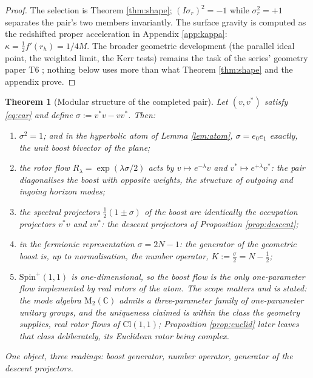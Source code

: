 \documentclass[11pt]{article}
\newtheorem{theorem}{Theorem}[section]
\theoremstyle{definition}
\newcommand{\Cl}{\mathrm{Cl}}
\newcommand{\C}{\mathbb{C}}
\newcommand{\Mat}{\mathrm{M}}
\begin{document}
\begin{proof}
The selection is Theorem \ref{thm:shape}; $(I\sigma_r)^2 = -1$ while $\sigma_r^2 = +1$ separates the pair's two members invariantly. The surface gravity is computed as the redshifted proper acceleration in Appendix \ref{app:kappa}: $\kappa = \tfrac12 f'(r_h) = 1/4M$. The broader geometric development (the parallel ideal point, the weighted limit, the Kerr tests) remains the task of the series' geometry paper T6 \cite{ButlerT6}; nothing below uses more than what Theorem \ref{thm:shape} and the appendix prove.
\end{proof}

\begin{theorem}[Modular structure of the completed pair]\label{thm:modular}
Let $(v, v^*)$ satisfy \eqref{eq:car} and define $\sigma := v^* v - v v^*$. Then:
\begin{enumerate}
\item $\sigma^2 = 1$; and in the hyperbolic atom of Lemma \ref{lem:atom}, $\sigma = e_0 e_1$ exactly, the unit boost bivector of the plane;
\item the rotor flow $R_\lambda = \exp(\lambda\sigma/2)$ acts by $v \mapsto e^{-\lambda} v$ and $v^* \mapsto e^{+\lambda} v^*$: the pair diagonalises the boost with opposite weights, the structure of outgoing and ingoing horizon modes;
\item the spectral projectors $\tfrac12(1 \pm \sigma)$ of the boost are identically the occupation projectors $v^* v$ and $v v^*$: the descent projectors of Proposition \ref{prop:descent};
\item in the fermionic representation $\sigma = 2N - 1$: the generator of the geometric boost is, up to normalisation, the number operator, $K := \tfrac{\sigma}{2} = N - \tfrac12$;
\item $\mathrm{Spin}^+(1,1)$ is one-dimensional, so the boost flow is the \emph{only} one-parameter flow implemented by real rotors of the atom. The scope matters and is stated: the mode algebra $\Mat_2(\C)$ admits a three-parameter family of one-parameter unitary groups, and the uniqueness claimed is within the class the geometry supplies, real rotor flows of $\Cl(1,1)$; Proposition \ref{prop:euclid} later leaves that class deliberately, its Euclidean rotor being complex.
\end{enumerate}
One object, three readings: boost generator, number operator, generator of the descent projectors.
\end{theorem}
\end{document}
